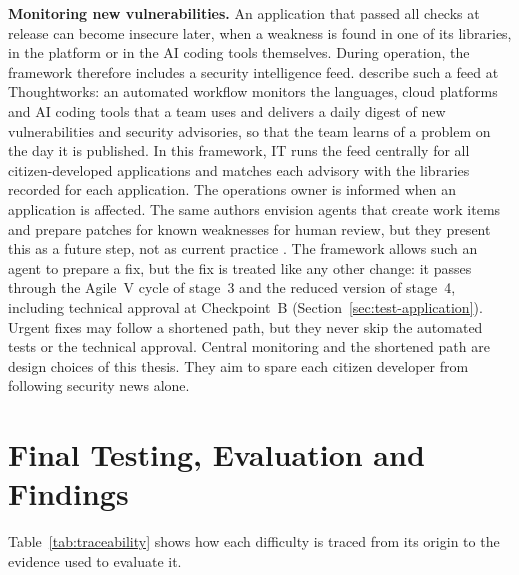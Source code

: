 \documentclass[10pt,a4paper]{article}
\begin{document}
\textbf{Monitoring new vulnerabilities.} An application that passed all
checks at release can become insecure later, when a weakness is found in
one of its libraries, in the platform or in the AI coding tools
themselves. During operation, the framework therefore includes a security
intelligence feed. \textcite{TODO-koul2026vibesec} describe such a feed at
Thoughtworks: an automated workflow monitors the languages, cloud platforms
and AI coding tools that a team uses and delivers a daily digest of new
vulnerabilities and security advisories, so that the team learns of a
problem on the day it is published. In this framework, IT runs the feed
centrally for all citizen-developed applications and matches each advisory
with the libraries recorded for each application. The operations owner is
informed when an application is affected. The same authors envision agents
that create work items and prepare patches for known weaknesses for human
review, but they present this as a future step, not as current practice
\parencite{TODO-koul2026vibesec}. The framework allows such an agent to
prepare a fix, but the fix is treated like any other change: it passes
through the Agile~V cycle of stage~3 and the reduced version of stage~4,
including technical approval at Checkpoint~B
(Section~\ref{sec:test-application}). Urgent fixes may follow a shortened
path, but they never skip the automated tests or the technical approval.
Central monitoring and the shortened path are design choices of this
thesis. They aim to spare each citizen developer from following security
news alone.
 

\section{Final Testing, Evaluation and Findings}
\label{sec:evaluation}


Table~\ref{tab:traceability} shows how each difficulty is traced from
its origin to the evidence used to evaluate it.
 
\end{document}
